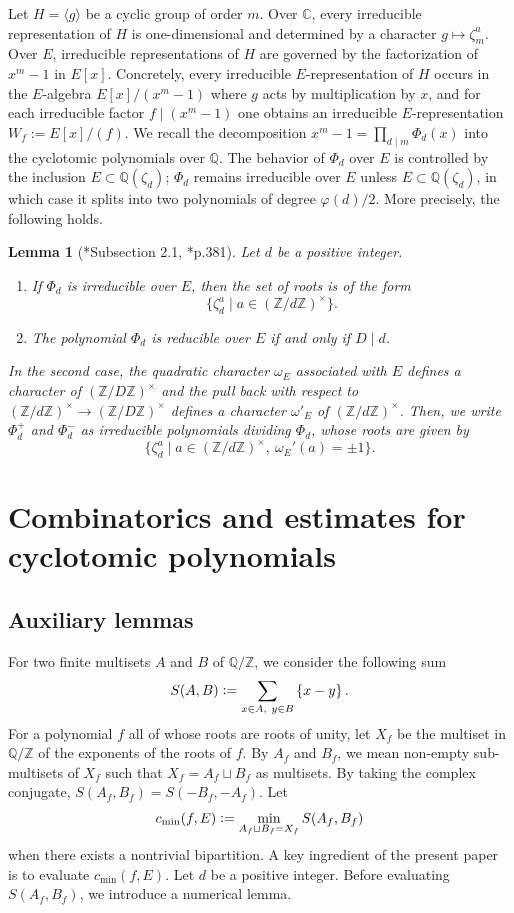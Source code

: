 \documentclass[11pt]{amsart}
\theoremstyle{plain}
\newtheorem{lem}[thm]{Lemma}
\theoremstyle{definition}
\numberwithin{equation}{section}
\newcommand{\bbC}{\mathbb{C}}
\newcommand{\bbQ}{\mathbb{Q}}
\newcommand{\bbZ}{\mathbb{Z}}
\newcommand{\defeq}{\vcentcolon=}
\begin{document}
Let $H=\langle g\rangle$ be a cyclic group of order $m$. Over $\bbC$, every irreducible
representation of $H$ is one-dimensional and determined by a character
$g\mapsto \zeta_m^a$. Over $E$, irreducible representations of $H$ are governed by the factorization
of $x^m-1$ in $E[x]$. 
Concretely, every irreducible $E$-representation of $H$ occurs in the $E$-algebra
$E[x]/(x^m-1)$ where $g$ acts by multiplication by $x$, and for each irreducible factor
$f\mid (x^m-1)$ one obtains an irreducible $E$-representation $W_f:=E[x]/(f)$.
We recall the decomposition $x^m-1=\prod_{d\mid m}\Phi_d(x)$ into the cyclotomic polynomials over $\bbQ$.
The behavior of $\Phi_d$ over $E$ is controlled by the inclusion $E\subset \bbQ(\zeta_d)$;
$\Phi_d$ remains irreducible over $E$ unless $E\subset \bbQ(\zeta_d)$, in which case it
splits into two polynomials of degree $\varphi(d)/2$.
More precisely, the following holds.
\begin{lem}[{\cite{behrens2012singularities}*{Subsection 2.1}, \cite{1928_Weisner}*{p.381}}]
  Let $d$ be a positive integer.
  \begin{enumerate}
    \item If $\Phi_d$ is irreducible over $E$, then the set of roots is of the form
      \[
        \{\zeta_d^a \mid a \in (\bbZ/d\bbZ)^\times\}.
      \]
    \item
      The polynomial $\Phi_d$ is reducible over $E$ if and only if $D\mid d$.
  \end{enumerate}
  In the second case, the quadratic character $\omega_E$ associated with $E$ defines a character of $(\bbZ/D\bbZ)^\times$ and the pull back with respect to $(\bbZ/d\bbZ)^\times \rightarrow (\bbZ/D\bbZ)^\times$ defines a character $\omega'_E$ of $(\bbZ/d\bbZ)^\times$.
  Then, we write $\Phi_d^+$ and $\Phi_d^-$ as irreducible polynomials dividing $\Phi_d$, whose roots are given by
    \[
      \{\zeta_d^a  \mid a \in (\bbZ/d\bbZ)^\times,\ \omega_E'(a) = \pm1 \}.
  \]
\end{lem}




\section{Combinatorics and estimates for cyclotomic polynomials}\label{section_auxiliary_lemma}
\subsection{Auxiliary lemmas}
For two finite multisets $A$ and $B$ of $\bbQ/\bbZ$, we consider the following sum
\[
  S(A,B)\defeq \sum_{x \in A,\ y \in B} \left\{ x-y\right\}.
\]
For a polynomial $f$ all of whose roots are roots of unity, let $X_f$ be the multiset in $\bbQ/\bbZ$ of the exponents of the roots of $f$.
By $A_f$ and $B_f$, we mean non-empty sub-multisets of $X_f$ such that $X_f = A_f \sqcup B_f$ as multisets.
By taking the complex conjugate, $S(A_f,B_f) = S(-B_f,-A_f)$.
Let
\[
  c_{\min}(f,E) \defeq \min_{A_f \sqcup B_f = X_f} S(A_f,B_f)
\]
when there exists a nontrivial bipartition.
A key ingredient of the present paper is to evaluate $c_{\min}(f, E)$.
Let $d$ be a positive integer.
Before evaluating $S(A_f, B_f)$, we introduce a numerical lemma.
\end{document}
